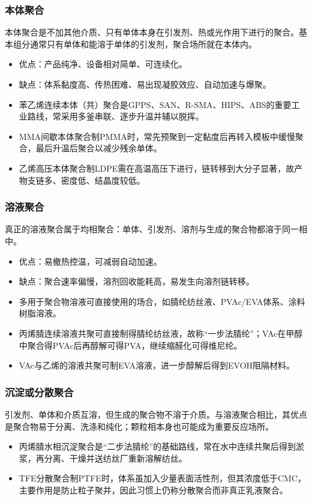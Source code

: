﻿\documentclass[12pt,a4paper]{article}
\begin{document}
\subsubsection{本体聚合}
本体聚合是不加其他介质、只有单体本身在引发剂、热或光作用下进行的聚合。基本组分通常只有单体和能溶于单体的引发剂，聚合场所就在本体内。
\begin{itemize}
  \item 优点：产品纯净、设备相对简单、可连续化。
  \item 缺点：体系黏度高、传热困难、易出现凝胶效应、自动加速与爆聚。
  \item 苯乙烯连续本体（共）聚合是GPPS、SAN、R-SMA、HIPS、ABS的重要工业路线，常采用多釜串联、逐步升温并辅以脱挥。
  \item MMA间歇本体聚合制PMMA时，常先预聚到一定黏度后再转入模板中缓慢聚合，最后升温后聚合以减少残余单体。
  \item 乙烯高压本体聚合制LDPE需在高温高压下进行，链转移到大分子显著，故产物支链多、密度低、结晶度较低。
\end{itemize}

\subsubsection{溶液聚合}
真正的溶液聚合属于均相聚合：单体、引发剂、溶剂与生成的聚合物都溶于同一相中。
\begin{itemize}
  \item 优点：易撤热控温，可减弱自动加速。
  \item 缺点：聚合速率偏慢，溶剂回收能耗高，易发生向溶剂链转移。
  \item 多用于聚合物溶液可直接使用的场合，如腈纶纺丝液、PVAc/EVA体系、涂料树脂溶液。
  \item 丙烯腈连续溶液共聚可直接制得腈纶纺丝液，故称“一步法腈纶”；VAc在甲醇中聚合得PVAc后再醇解可得PVA，继续缩醛化可得维尼纶。
  \item VAc与乙烯的溶液共聚可制EVA溶液，进一步醇解后得到EVOH阻隔材料。
\end{itemize}

\subsubsection{沉淀或分散聚合}
引发剂、单体和介质互溶，但生成的聚合物不溶于介质。与溶液聚合相比，其优点是聚合物易于分离、洗涤和纯化；颗粒相本身也可能成为重要反应场所。
\begin{itemize}
  \item 丙烯腈水相沉淀聚合是“二步法腈纶”的基础路线，常在水中连续共聚后得到淤浆，再分离、干燥并送纺丝厂重新溶解纺丝。
  \item TFE分散聚合制PTFE时，体系虽加入少量表面活性剂，但其浓度低于CMC，主要作用是防止粒子聚并，因此习惯上仍称分散聚合而非真正乳液聚合。
\end{itemize}
\end{document}
